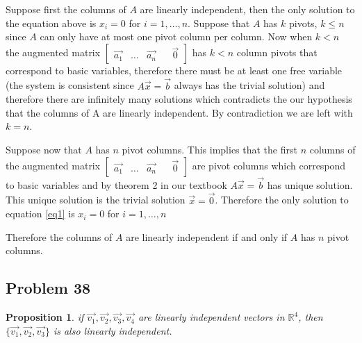 \documentclass[12pt, letterpaper]{article}
\newcommand{\R}{\mathbb{R}}
\theoremstyle{statement}
\newtheorem*{atmProp}{Proposition}
\begin{document}
            Suppose first the columns of $A$ are linearly independent, then the only solution to the equation above is $x_i = 0$ for $i = 1, \dots, n$. Suppose that $A$ has $k$ pivots, $k \leq n$ since $A$ can only have at most one pivot column per column. Now when $k < n$ the augmented matrix $\begin{bmatrix} \vec{a_1} & \dots & \vec{a_n} && \vec{0}\end{bmatrix}$ has $k < n$ column pivots that correspond to basic variables, therefore there must be at least one free variable (the system is consistent since $A\vec{x}=\vec{b}$ always has the trivial solution) and therefore there are infinitely many solutions which contradicts the our hypothesis that the columns of A are linearly independent. By contradiction we are left with $k=n$.
            
            Suppose now that $A$ has $n$ pivot columns. This implies that the first $n$ columns of the augmented matrix $\begin{bmatrix} \vec{a_1} & \dots & \vec{a_n} && \vec{0}\end{bmatrix}$ are pivot columns which correspond to basic variables and by theorem 2 in our textbook $A\vec{x}=\vec{b}$ has unique solution. This unique solution is the trivial solution $\vec{x}=\vec{0}$. Therefore the only solution to equation \ref{eq1} is $x_i = 0$ for $i=1,\dots,n$
            
            Therefore the columns of $A$ are linearly independent if and only if $A$ has $n$ pivot columns.
            
            \subsection*{Problem 38}
            
            \begin{atmProp}
            if $\vec{v_1}, \vec{v_2}, \vec{v_3}, \vec{v_4}$ are linearly independent vectors in $\R^4$, then $\{\vec{v_1}, \vec{v_2}, \vec{v_3}\}$ is also linearly independent.
            \end{atmProp}
            
\end{document}
